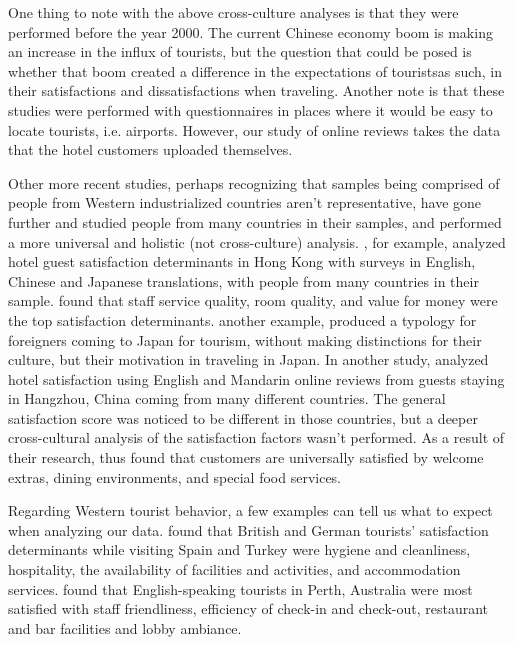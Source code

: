 One thing to note with the above cross-culture analyses is that they were performed before the year 2000. The current Chinese economy boom is making an increase in the influx of tourists, but the question that could be posed is whether that boom created a difference in the expectations of tourists\DIFdelbegin {}\DIFdelend \DIFaddbegin {}\DIFaddend as such, in their satisfactions and dissatisfactions when traveling. Another note is that these studies were performed with questionnaires in places where it would be easy to locate tourists, i.e. airports. However, our study of online reviews takes the data that the hotel customers uploaded themselves.

Other more recent studies, perhaps recognizing that samples being comprised of people from Western industrialized countries aren't representative, have gone further and studied people from many countries in their samples, and performed a more universal and holistic (not cross-culture) analysis. \cite{choi2001}, for example, analyzed hotel guest satisfaction determinants in Hong Kong with surveys in English, Chinese and Japanese translations, with people from many countries in their sample. \cite{choi2001} found that staff service quality, room quality, and value for money were the top satisfaction determinants. \DIFdelbegin {}\DIFdelend \DIFaddbegin {}\DIFaddend another example, \cite{Uzama2012} produced a typology for foreigners coming to Japan for tourism, without making distinctions for their culture, but their motivation in traveling in Japan. In another study, \cite{zhou2014} analyzed hotel satisfaction using English and Mandarin online reviews from guests staying in Hangzhou, China coming from many different countries. The general satisfaction score was noticed to be different in those countries, but a deeper cross-cultural analysis of the satisfaction factors wasn't performed. As a result of their research, \cite{zhou2014} thus found that customers are universally satisfied by welcome extras, dining environments, and special food services. 

Regarding Western tourist behavior, a few examples can tell us what to expect when analyzing our data. \cite{kozak2002} found that British and German tourists' satisfaction determinants while visiting Spain and Turkey were hygiene and cleanliness, hospitality, the availability of facilities and activities, and accommodation services. \cite{shanka2004} found that English-speaking tourists in Perth, Australia were most satisfied with staff friendliness, efficiency of check-in and check-out, restaurant and bar facilities and lobby ambiance. 

